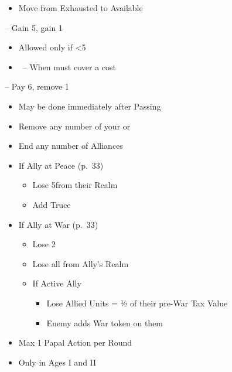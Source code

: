 \documentclass[10pt]{article}
\begin{document}
\begin{itemize}
	\item Move \manpower from Exhausted to Available
\end{itemize}

 -- Gain 5\ducats, gain 1\interest
\begin{itemize}
	\item Allowed only if <5\interest
	\item \reaction~-- When must cover a cost
\end{itemize}
 -- Pay 6\ducats, remove 1\interest
\begin{itemize}
	\item May be done immediately after Passing
\end{itemize}

\begin{itemize}
	\item Remove any number of your \influence or \claims
	\item End any number of Alliances
	\item If Ally at Peace (p.~33)
	\begin{itemize}
		\item Lose 5\influence from their Realm
		\item Add Truce
	\end{itemize}
	\item If Ally at War (p.~33)
	\begin{itemize}
		\item Lose 2\stability
		\item Lose all \influence from Ally's Realm
		\item If Active Ally
		\begin{itemize}
			\item Lose Allied Units = ½ of their pre-War Tax Value
			\item Enemy adds War token on them
		\end{itemize}
	\end{itemize}
\end{itemize}

\framebreak %
\begin{itemize}
	\item Max 1 Papal Action per Round
	\item Only in Ages I and II
\end{itemize}
\end{document}
